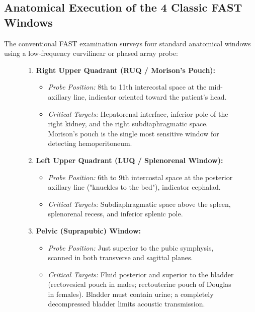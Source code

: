\documentclass[11pt,a4paper]{article}
\begin{document}
\subsection{Anatomical Execution of the 4 Classic FAST Windows}
The conventional FAST examination surveys four standard anatomical windows using a low-frequency curvilinear or phased array probe:

\begin{figure}[htbp]
\centering
\begin{tcolorbox}[colback=purple!5!white,colframe=purple!60!black,title=\textbf{The Four Standard FAST Acoustic Windows},width=\linewidth]
\small
\begin{enumerate}[leftmargin=1.5em]
    \item \textbf{Right Upper Quadrant (RUQ / Morison's Pouch):}
    \begin{itemize}
        \item \textit{Probe Position:} 8th to 11th intercostal space at the mid-axillary line, indicator oriented toward the patient's head.
        \item \textit{Critical Targets:} Hepatorenal interface, inferior pole of the right kidney, and the right subdiaphragmatic space. Morison's pouch is the single most sensitive window for detecting hemoperitoneum.
    \end{itemize}
    \item \textbf{Left Upper Quadrant (LUQ / Splenorenal Window):}
    \begin{itemize}
        \item \textit{Probe Position:} 6th to 9th intercostal space at the posterior axillary line ("knuckles to the bed"), indicator cephalad.
        \item \textit{Critical Targets:} Subdiaphragmatic space above the spleen, splenorenal recess, and inferior splenic pole.
    \end{itemize}
    \item \textbf{Pelvic (Suprapubic) Window:}
    \begin{itemize}
        \item \textit{Probe Position:} Just superior to the pubic symphysis, scanned in both transverse and sagittal planes.
        \item \textit{Critical Targets:} Fluid posterior and superior to the bladder (rectovesical pouch in males; rectouterine pouch of Douglas in females). Bladder must contain urine; a completely decompressed bladder limits acoustic transmission.
    \end{itemize}

\end{enumerate}
\end{tcolorbox}
\end{figure}
\end{document}
